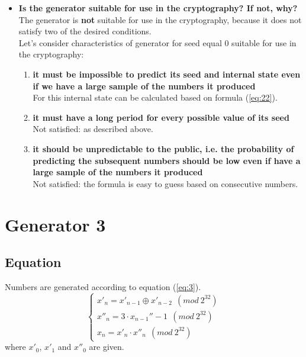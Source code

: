 \documentclass[a4paper,10pt]{article}
\begin{document}
\begin{itemize}
 \item \textbf{Is the generator suitable for use in the cryptography? If not, why?} \\
  The generator is \textbf{not} suitable for use in the cryptography, because it does not satisfy two of the desired conditions.\\
 Let's consider characteristics of generator for seed equal 0 suitable for use in the cryptography:
  \begin{enumerate}
   \item \textbf{it must be impossible to predict its seed and internal state even if we have a large sample of the numbers it produced} \\
   For this internal state can be calculated based on formula (\ref{eq:22}).
   \item \textbf{it must have a long period for every possible value of its seed} \\
   Not satisfied: as described above.
   \item \textbf{it should be unpredictable to the public, i.e. the probability of predicting the subsequent numbers should be low even if have a large sample of the numbers it produced} \\
   Not satisfied: the formula is easy to guess based on consecutive numbers.
   \end{enumerate}

\end{itemize}


\section{Generator 3}
\subsection{Equation}
Numbers are generated according to equation (\ref{eq:3}).
\begin{equation}
\label{eq:3}
\begin{cases}
x'_n = x'_{n-1} \oplus x'_{n-2}\ \ (mod\ 2^{32}) \\ x''_n = 3 \cdot x_{n-1}'' - 1\ \ (mod\ 2^{32}) \\ x_n = x'_n \cdot x''_n\ \ (mod\ 2^{32})
\end{cases}
\end{equation}
where ${x'_0}$, ${x'_1}$ and ${x''_0}$ are given.
\end{document}
